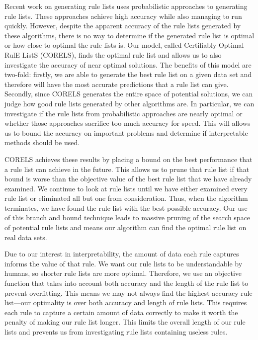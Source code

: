 \documentclass[]{report}
\theoremstyle{definition}
\begin{document}
Recent work on generating rule lists \cite{LethamRuMcMa15,YangRuSe16} uses probabilistic approaches to generating rule lists.
These approaches achieve high accuracy while also managing to run quickly.
However, despite the apparent accuracy of the rule lists generated by these algorithms, there is no way to determine if the generated rule list is optimal or how close to optimal the rule lists is. 
Our model, called Certifiably Optimal RulE ListS (CORELS), finds the optimal rule list and allows us to also investigate the accuracy of near optimal solutions. 
The benefits of this model are two-fold: firstly, we are able to generate the best rule list on a given data set and therefore will have the most accurate predictions that a rule list can give.
Secondly, since CORELS generates the entire space of potential solutions, we can judge how good rule lists generated by other algorithms are. 
In particular, we can investigate if the rule lists from probabilistic approaches are nearly optimal or whether those approaches sacrifice too much accuracy for speed.
This will allows us to bound the accuracy on important problems and determine if interpretable methods should be used.

CORELS achieves these results by placing a bound on the best performance that a rule list can achieve in the future. 
This allows us to prune that rule list if that bound is worse than the objective value of the best rule list that we have already examined.
We continue to look at rule lists until we have either examined every rule list or eliminated all but one from consideration. 
Thus, when the algorithm terminates, we have found the rule list with the best possible accuracy. 
Our use of this branch and bound technique leads to massive pruning of the search space of potential rule lists and means our algorithm can find the optimal rule list on real data sets.

Due to our interest in interpretability, the amount of data each rule captures informs the value of that rule. 
We want our rule lists to be understandable by humans, so shorter rule lists are more optimal. 
Therefore, we use an objective function that takes into account both accuracy and the length of the rule list to prevent overfitting. 
This means we may not always find the highest accuracy rule list---our optimality is over both accuracy and length of rule lists.
This requires each rule to capture a certain amount of data correctly to make it worth the penalty of making our rule list longer. 
This limits the overall length of our rule lists and prevents us from investigating rule lists containing useless rules.
\end{document}
